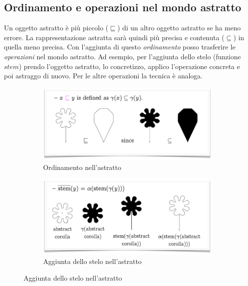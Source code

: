 \documentclass[a4paper,oneside,titlepage]{book}
\begin{document}
\subsection{Ordinamento e operazioni nel mondo astratto}
Un oggetto astratto è più piccolo ($\sqsubseteq$) di un altro oggetto astratto se ha meno errore. La rappresentazione astratta sarà quindi più precisa e contenuta ($\subseteq$) in quella meno precisa. Con l'aggiunta di questo \textit{ordinamento} posso trasferire le \textit{operazioni} nel mondo astratto. Ad esempio, per l'aggiunta dello stelo (funzione $stem$) prendo l'oggetto astratto, lo concretizzo, applico l'operazione concreta e poi astraggo di nuovo. Per le altre operazioni la tecnica è analoga.
\begin{figure}[htp]
	\begin{subfigure}{0.49\textwidth}
	    \centering
		\includegraphics[width=\textwidth, height=\textheight, keepaspectratio]{absOp1.png}
		\caption{Ordinamento nell'astratto}
	\end{subfigure}
	\hfill
	\begin{subfigure}{0.49\textwidth}
	    \centering
		\includegraphics[width=\textwidth, height=\textheight, keepaspectratio]{absOp2.png} 
		\caption{Aggiunta dello stelo nell'astratto}
	\end{subfigure}
\end{figure}
\end{document}
